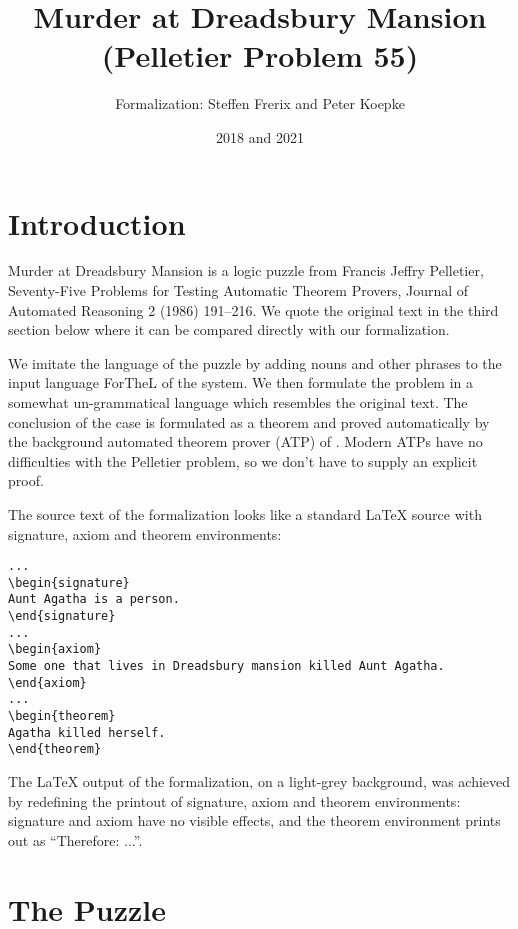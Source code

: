 \documentclass{article}
\title{Murder at Dreadsbury Mansion (Pelletier Problem 55)}
\author{\Naproche{} Formalization: Steffen Frerix and Peter Koepke}
\date{2018 and 2021}
\begin{document}

\maketitle


\section{Introduction}

Murder at Dreadsbury Mansion is a logic puzzle from
Francis Jeffry Pelletier, Seventy-Five Problems for Testing
Automatic Theorem Provers, Journal of Automated Reasoning 2 (1986) 191--216.
We quote the original text in the third section below where it can
be compared directly with our formalization.

We imitate the language of the puzzle by
adding nouns and other phrases to the input language ForTheL of the \Naproche{} system.
We then formulate the problem in a somewhat un-grammatical language
which resembles the original text.
The conclusion of the case is formulated as a theorem and
proved automatically by the background automated theorem prover (ATP) of \Naproche. Modern
ATPs have no difficulties with the Pelletier problem, so we don't
have to supply an explicit proof.

The source text of the formalization looks like a standard \LaTeX{} source
with signature, axiom and theorem environments:

\begin{verbatim}
...
\begin{signature}
Aunt Agatha is a person.
\end{signature}
...
\begin{axiom}
Some one that lives in Dreadsbury mansion killed Aunt Agatha.
\end{axiom}
...
\begin{theorem}
Agatha killed herself.
\end{theorem}
\end{verbatim}

The \LaTeX{} output of the formalization, on a light-grey background, was
achieved by redefining the printout of signature,
axiom and theorem environments: signature and axiom have no
visible effects, and
the theorem environment prints out as ``Therefore: ...''.

\section{The Puzzle}
\end{document}
